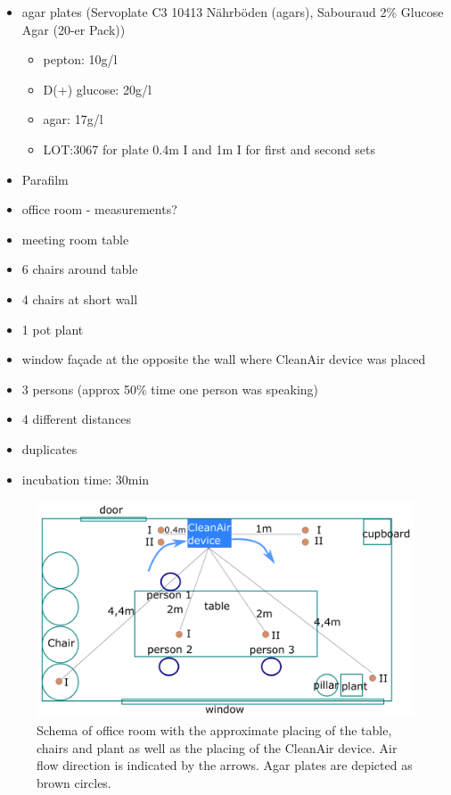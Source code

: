 \documentclass[hyperref]{labbook}
\begin{document}
\newpage
{}
\begin{itemize}
\item agar plates (Servoplate C3 10413 Nährböden (agars), Sabouraud 2\% Glucose Agar (20-er Pack))
\begin{itemize}
\item pepton: 10g/l
\item D(+) glucose: 20g/l
\item agar: 17g/l
\item LOT:3067 for plate 0.4m I and 1m I for first and second sets
\end{itemize}
\item Parafilm
\end{itemize}
\begin{itemize}
\item office room - measurements?
\item meeting room table 
\item 6 chairs around table
\item 4 chairs at short wall
\item 1 pot plant
\item window façade at the opposite the wall where CleanAir device was placed
\item 3 persons (approx 50\% time one person was speaking)
\end{itemize}
\begin{itemize}
\item 4 different distances
\item duplicates
\item incubation time: 30min
\end{itemize}
\begin{figure}[H]
\includegraphics[scale=0.28]{cleanair_experiment_schema2}
\caption{Schema of office room with the approximate placing of the table, chairs and plant as well as the placing of the CleanAir device. Air flow direction is indicated by the arrows. Agar plates are depicted as brown circles.}
\end{figure}
\end{document}
